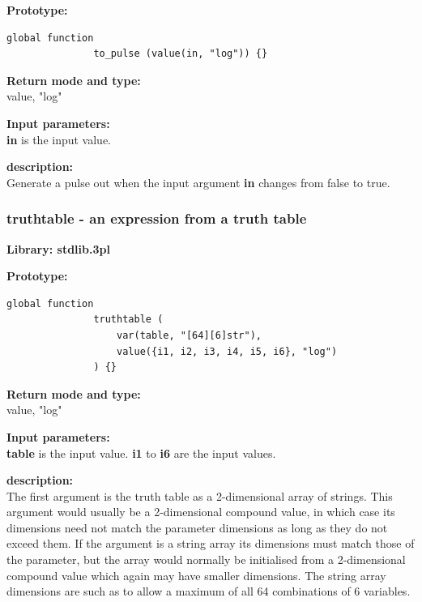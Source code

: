             {\bf Prototype:} \\
            \vsp
            \begin{lstlisting}[gobble=12, language=threepl]
               global function
               to_pulse (value(in, "log")) {}
            \end{lstlisting}

            {\bf Return mode and type:} \\
            value, "log"

            {\bf Input parameters:} \\
            {\bf in} is the input value.

            {\bf description:} \\
            Generate a pulse out when the input argument {\bf in}
            changes from false to true.


        \subsubsection{truthtable - an expression from a truth table}\label{sec:lftruthtable}

            {\bf Library: stdlib.3pl}

            {\bf Prototype:} \\
            \vsp
            \begin{lstlisting}[gobble=12, language=threepl]
               global function
               truthtable (
                   var(table, "[64][6]str"),
                   value({i1, i2, i3, i4, i5, i6}, "log")
               ) {}
            \end{lstlisting}

            {\bf Return mode and type:} \\
            value, "log"

            {\bf Input parameters:} \\
            {\bf table} is the input value.
            {\bf i1} to {\bf i6} are the input values.

            {\bf description:} \\
            The first argument is the truth table as a 2-dimensional
            array of strings. This argument would usually be a 2-dimensional
            compound value, in which case its dimensions need not match the
            parameter dimensions as long as they do not exceed them. If the
            argument is a string array its dimensions must match those of the
            parameter, but the array would normally be initialised from
            a 2-dimensional compound value which again may have smaller
            dimensions. The string array dimensions are such as to allow
            a maximum of all 64 combinations of 6 variables.
            
